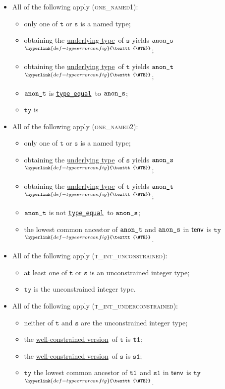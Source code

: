 \documentclass{book}
\newcommand\TypeErrorConfig[0]{\hyperlink{def-typeerrorconfig}{\texttt{\#TE}}}
\newcommand\ProseOrTypeError[0]{\hyperlink{def-proseortypeerror}{$^{\TypeErrorConfig}$}}
\newcommand\typeequal[0]{\hyperlink{def-typeequal}{\texttt{type\_equal}}}
\newcommand\underlyingtype[0]{\hyperlink{def-underlyingtype}{underlying type}}
\newcommand\wellconstrainedversion[0]{\hyperlink{def-towellconstrained}{well-constrained version}}
\newcommand\vt[0]{\texttt{t}}
\newcommand\vs[0]{\texttt{s}}
\newcommand\vsone[0]{\texttt{s1}}
\newcommand\tty[0]{\texttt{ty}}
\begin{document}
\begin{itemize}
\begin{itemize}
    \item All of the following apply (\textsc{one\_named1}):
    \begin{itemize}
      \item only one of $\vt$ or $\vs$ is a named type;
      \item obtaining the \underlyingtype\ of $\vs$ yields $\texttt{anon\_s}$ \ProseOrTypeError;
      \item obtaining the \underlyingtype\ of $\vt$ yields $\texttt{anon\_t}$ \ProseOrTypeError;
      \item $\texttt{anon\_t}$ is \typeequal\ to $\texttt{anon\_s}$;
      \item $\tty$ is
    \end{itemize}

    \item All of the following apply (\textsc{one\_named2}):
    \begin{itemize}
      \item only one of $\vt$ or $\vs$ is a named type;
      \item obtaining the \underlyingtype\ of $\vs$ yields $\texttt{anon\_s}$ \ProseOrTypeError;
      \item obtaining the \underlyingtype\ of $\vt$ yields $\texttt{anon\_t}$ \ProseOrTypeError;
      \item $\texttt{anon\_t}$ is not \typeequal\ to $\texttt{anon\_s}$;
      \item the lowest common ancestor of $\texttt{anon\_t}$ and $\texttt{anon\_s}$ in $\textsf{tenv}$ is $\tty$ \ProseOrTypeError.
    \end{itemize}

    \item All of the following apply (\textsc{t\_int\_unconstrained}):
    \begin{itemize}
      \item at least one of $\vt$ or $\vs$ is an unconstrained integer type;
      \item $\tty$ is the unconstrained integer type.
    \end{itemize}

    \item All of the following apply (\textsc{t\_int\_underconstrained}):
    \begin{itemize}
      \item neither of $\vt$ and $\vs$ are the unconstrained integer type;
      \item the \wellconstrainedversion\ of $\vt$ is $\texttt{t1}$;
      \item the \wellconstrainedversion\ of $\vs$ is $\vsone$;
      \item $\tty$ the lowest common ancestor of $\texttt{t1}$ and $\vsone$ in $\textsf{tenv}$ is $\tty$ \ProseOrTypeError.
    \end{itemize}


\end{itemize}
\end{itemize}
\end{document}
